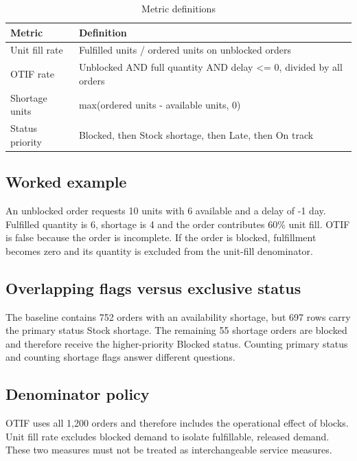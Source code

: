 \documentclass[conference,letterpaper]{IEEEtran}
\begin{document}
\begin{table}[H]
\caption{Metric definitions}\label{tab:3}
\centering\footnotesize
\setlength{\tabcolsep}{3pt}
\begin{tabularx}{\columnwidth}{>{\raggedright\arraybackslash}X >{\raggedright\arraybackslash}X}
\hline
\textbf{Metric} & \textbf{Definition} \\
\hline
Unit fill rate & Fulfilled units / ordered units on unblocked orders \\
OTIF rate & Unblocked AND full quantity AND delay <= 0, divided by all orders \\
Shortage units & max(ordered units - available units, 0) \\
Status priority & Blocked, then Stock shortage, then Late, then On track \\
\hline
\end{tabularx}
\end{table}

\subsection{Worked example}

An unblocked order requests 10 units with 6 available and a delay of -1 day. Fulfilled quantity is 6, shortage is 4 and the order contributes 60\% unit fill. OTIF is false because the order is incomplete. If the order is blocked, fulfillment becomes zero and its quantity is excluded from the unit-fill denominator.


\subsection{Overlapping flags versus exclusive status}

The baseline contains 752 orders with an availability shortage, but 697 rows carry the primary status Stock shortage. The remaining 55 shortage orders are blocked and therefore receive the higher-priority Blocked status. Counting primary status and counting shortage flags answer different questions.


\subsection{Denominator policy}

OTIF uses all 1,200 orders and therefore includes the operational effect of blocks. Unit fill rate excludes blocked demand to isolate fulfillable, released demand. These two measures must not be treated as interchangeable service measures.
\end{document}

